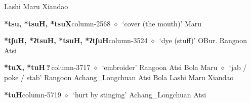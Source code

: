 \hspace{1ex}
         Lashi 
\hspace{1ex}
         Maru 
\hspace{1ex}
         Xiandao 
  \item {\footnotesize \textbf{*tsu, *tsuH, *tsuX}}{\tiny column-2568}
         $\diamond$~`cover (the mouth)'
         Maru 
  \item {\footnotesize \textbf{*tʃuH, *ʔtsuH, *tsuH, *ʔtʃuH}}{\tiny column-3524}
         $\diamond$~`dye (stuff)'
         OBur. 
\hspace{1ex}
         Rangoon 
\hspace{1ex}
         Atsi 
  \item {\footnotesize \textbf{*tuX, *tuH\,?\,}}{\tiny column-3717}
         $\diamond$~`embroider'
         Rangoon 
\hspace{1ex}
         Atsi 
\hspace{1ex}
         Bola 
\hspace{1ex}
         Maru 
\hspace{1ex}
         $\diamond$~`jab / poke / stab'
         Rangoon 
\hspace{1ex}
         Achang\_Longchuan 
\hspace{1ex}
         Atsi 
\hspace{1ex}
         Bola 
\hspace{1ex}
         Lashi 
\hspace{1ex}
         Maru 
\hspace{1ex}
         Xiandao 
  \item {\footnotesize \textbf{*tuH}}{\tiny column-5719}
         $\diamond$~`hurt by stinging'
         Achang\_Longchuan 
\hspace{1ex}
         Atsi 
\hspace{1ex}
